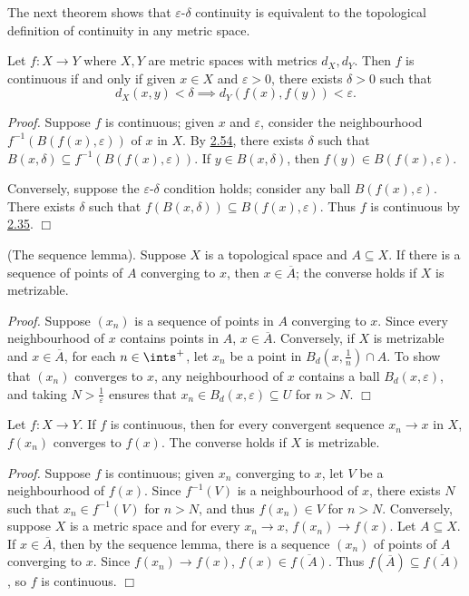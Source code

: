 The next theorem shows that $\varepsilon$-$\delta$ continuity is equivalent to the topological definition of continuity in any metric space.

\begin{theorem}\label{2.64}
    Let $f: X \rightarrow Y$ where $X, Y$ are metric spaces with metrics $d_X, d_Y$. Then $f$ is continuous if and only if given $x \in X$ and $\varepsilon > 0$, there exists $\delta > 0$ such that
    $$d_X(x, y) < \delta \implies d_Y(f(x), f(y)) < \varepsilon.$$
\end{theorem}
{\it Proof.} Suppose $f$ is continuous; given $x$ and $\varepsilon$, consider the neighbourhood $f^{-1}(B(f(x), \varepsilon))$ of $x$ in $X$. By \hyperref[2.54]{2.54}, there exists $\delta$ such that $B(x, \delta) \subseteq f^{-1}(B(f(x), \varepsilon))$. If $y \in B(x, \delta)$, then $f(y) \in B(f(x), \varepsilon)$.

Conversely, suppose the $\varepsilon$-$\delta$ condition holds; consider any ball $B(f(x), \varepsilon)$. There exists $\delta$ such that $f(B(x, \delta)) \subseteq B(f(x), \varepsilon)$. Thus $f$ is continuous by \hyperref[2.35]{2.35}. $\Box$

\begin{lemma}\label{2.65}
    (The sequence lemma). Suppose $X$ is a topological space and $A \subseteq X$. If there is a sequence of points of $A$ converging to $x$, then $x \in \overline{A}$; the converse holds if $X$ is metrizable.
\end{lemma}
{\it Proof.} Suppose $(x_n)$ is a sequence of points in $A$ converging to $x.$ Since every neighbourhood of $x$ contains points in $A$, $x \in \overline{A}$. Conversely, if $X$ is metrizable and $x \in \overline{A}$, for each $n \in \ints^+$, let $x_n$ be a point in $B_d(x, \frac1n) \cap A$. To show that $(x_n)$ converges to $x$, any neighbourhood of $x$ contains a ball $B_d(x, \varepsilon)$, and taking $N > \frac{1}{\varepsilon}$ ensures that $x_n \in B_d(x, \varepsilon) \subseteq U$ for $n > N$. $\Box$

\begin{theorem}\label{2.66}
    Let $f: X \rightarrow Y$. If $f$ is continuous, then for every convergent sequence $x_n \rightarrow x$ in $X$, $f(x_n)$ converges to $f(x)$. The converse holds if $X$ is metrizable.
\end{theorem}
{\it Proof.} Suppose $f$ is continuous; given $x_n$ converging to $x$, let $V$ be a neighbourhood of $f(x)$. Since $f^{-1}(V)$ is a neighbourhood of $x$, there exists $N$ such that $x_n \in f^{-1}(V)$ for $n > N$, and thus $f(x_n) \in V$ for $n > N$. Conversely, suppose $X$ is a metric space and for every $x_n \rightarrow x$, $f(x_n) \rightarrow f(x)$. Let $A \subseteq X$. If $x \in \overline{A}$, then by the sequence lemma, there is a sequence $(x_n)$ of points of $A$ converging to $x$. Since $f(x_n) \rightarrow f(x)$, $f(x) \in \overline{f(A)}$. Thus $f(\overline{A}) \subseteq \overline{f(A)}$, so $f$ is continuous. $\Box$

